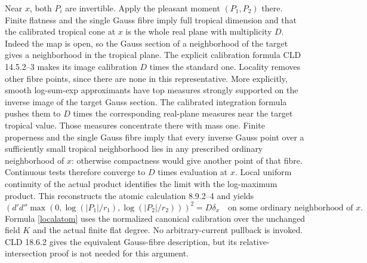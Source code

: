 \documentclass[11pt]{article}
\newcommand{\DD}{d'd''}
\theoremstyle{remark}\newtheorem{remark}[theorem]{Remark}
\begin{document}
Near $x$, both $P_i$ are invertible. Apply the pleasant moment
$(P_1,P_2)$ there. Finite flatness and the single Gauss fibre imply
full tropical dimension and that the calibrated tropical cone at
$x$ is the whole real plane with multiplicity $D$.
Indeed the map is open, so the Gauss section of a neighborhood of
the target gives a neighborhood in the tropical plane. The explicit
calibration formula CLD 14.5.2--3 makes its image calibration
$D$ times the standard one. Locality removes other fibre points,
since there are none in this representative. More explicitly,
smooth log-sum-exp approximants have top measures strongly
supported on the inverse image of the target Gauss section.
The calibrated integration formula pushes them to $D$ times the
corresponding real-plane measures near the target tropical value.
Those measures concentrate there with mass one. Finite properness
and the single Gauss fibre imply that every inverse Gauss point
over a sufficiently small tropical neighborhood lies in any
prescribed ordinary neighborhood of $x$: otherwise compactness
would give another point of that fibre. Continuous tests therefore
converge to $D$ times evaluation at $x$. Local uniform continuity
of the actual product identifies the limit with the log-maximum
product. This reconstructs the atomic calculation 8.9.2--4 and yields
\begin{equation}\label{localatom}
 \left(\DD\max(0,\log(|P_1|/r_1),\log(|P_2|/r_2))\right)^2
 =D\delta_x
 \quad\text{on some ordinary neighborhood of }x.
\end{equation}
Formula \eqref{localatom} uses the normalized
canonical calibration over the unchanged field $K$ and the actual
finite flat degree. No arbitrary-current pullback is invoked.
CLD 18.6.2 gives the equivalent Gauss-fibre description, but its
relative-intersection proof is not needed for this argument.
\end{document}
